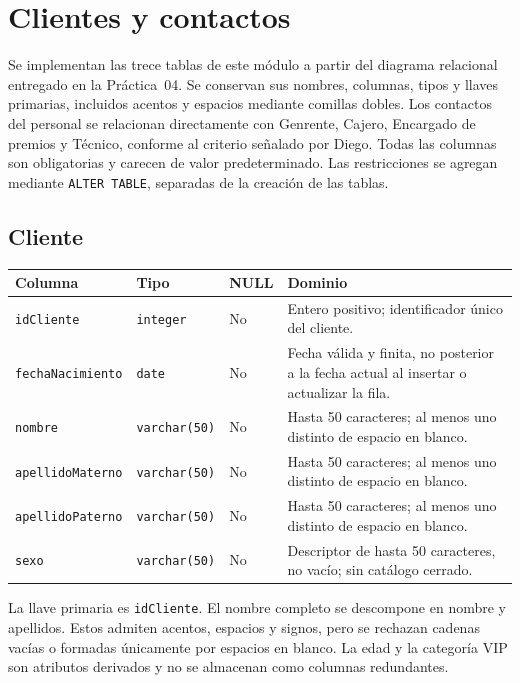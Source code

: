 \section{Clientes y contactos}

Se implementan las trece tablas de este módulo a partir del diagrama
relacional entregado en la Práctica~04. Se conservan sus nombres,
columnas, tipos y llaves primarias, incluidos acentos y espacios mediante
comillas dobles. Los contactos del personal se relacionan directamente
con Genrente, Cajero, Encargado de premios y Técnico, conforme al criterio
señalado por Diego. Todas las columnas son obligatorias y carecen de
valor predeterminado. Las restricciones se agregan mediante
\texttt{ALTER TABLE}, separadas de la creación de las tablas.

\begingroup
\small
\setlength{\tabcolsep}{5pt}
\renewcommand{\arraystretch}{1.2}

\subsection{Cliente}

\noindent\begin{tabular}{@{}p{}p{}p{}p{}@{}}
\hline
\textbf{Columna} & \textbf{Tipo} & \textbf{NULL} & \textbf{Dominio} \\
\hline
\texttt{idCliente} & \texttt{integer} & No & Entero positivo; identificador único del cliente. \\
\texttt{fechaNacimiento} & \texttt{date} & No & Fecha válida y finita, no posterior a la fecha actual al insertar o actualizar la fila. \\
\texttt{nombre} & \texttt{varchar(50)} & No & Hasta 50 caracteres; al menos uno distinto de espacio en blanco. \\
\texttt{apellidoMaterno} & \texttt{varchar(50)} & No & Hasta 50 caracteres; al menos uno distinto de espacio en blanco. \\
\texttt{apellidoPaterno} & \texttt{varchar(50)} & No & Hasta 50 caracteres; al menos uno distinto de espacio en blanco. \\
\texttt{sexo} & \texttt{varchar(50)} & No & Descriptor de hasta 50 caracteres, no vacío; sin catálogo cerrado. \\
\hline
\end{tabular}

La llave primaria es \texttt{idCliente}. El nombre completo se descompone
en nombre y apellidos. Estos admiten acentos, espacios y signos, pero
se rechazan cadenas vacías o formadas únicamente por espacios en blanco.
La edad y la categoría VIP son atributos derivados y no se almacenan
como columnas redundantes.

